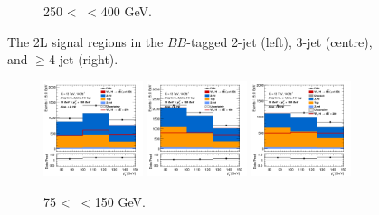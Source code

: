 \begin{figure}[h!]
\begin{subfigure}[b]{\textwidth}
        \caption{250 < \ptv\ < 400 GeV.}
        \label{fig:plots_VHbb_2L_250_SR}
    \end{subfigure}
    \caption{The 2L signal regions in the $BB$-tagged 2-jet (left), 3-jet (centre), and $\geq$4-jet (right).}
     \label{fig:plots_VHbb_2L_SR}
\end{figure} 

\vspace*{\fill}\clearpage
\vspace*{\fill}

\begin{figure}[h!]
    \centering
    \begin{subfigure}[b]{\textwidth}
        \centering
        \includegraphics[width=0.32\textwidth]{Images/VH/Own_fit/prefit_VHbb/Region_distpTV_BMax150_BMin75_DCRHigh_J2_TTypebb_T2_L2_Y6051_Prefit.png}
        \includegraphics[width=0.32\textwidth]{Images/VH/Own_fit/prefit_VHbb/Region_distpTV_BMax150_BMin75_DCRHigh_J3_TTypebb_T2_L2_Y6051_Prefit.png}
        \includegraphics[width=0.32\textwidth]{Images/VH/Own_fit/prefit_VHbb/Region_distpTV_BMax150_BMin75_DCRHigh_J4_TTypebb_incJet1_T2_L2_Y6051_Prefit.png}
        \caption{75 < \ptv\ < 150 GeV.}
        \label{fig:plots_VHbb_2L_75_CRL}
    \end{subfigure}
    \begin{subfigure}[b]{\textwidth}

\end{subfigure}
\end{figure}
